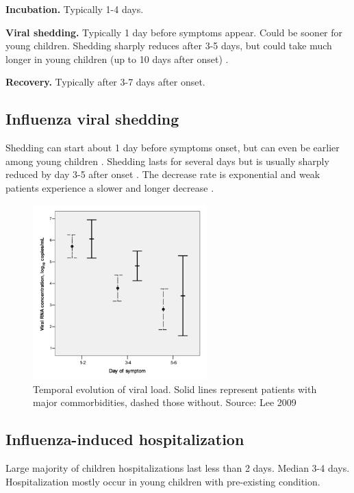 \documentclass[11pt, onecolumn]{article}
\begin{document}
\textbf{Incubation.} Typically 1-4 days.

\textbf{Viral shedding.} Typically 1 day before symptoms appear. Could be sooner for young children. Shedding sharply reduces after 3-5 days, but could take much longer in young children (up to 10 days after onset) \cite{Carrat:2008bk}. 

\textbf{Recovery.} Typically after 3-7 days after onset.


\subsection{Influenza viral shedding}

Shedding can start about 1 day before symptoms onset, but can even be earlier among young children \cite{CDC:2011wq}. Shedding lasts for several days but is usually sharply reduced by day 3-5 after onset \cite{CDC:2011wq}. The decrease rate is exponential and weak patients experience a slower and longer decrease \cite{Lee:2009dc}.

\begin{figure}[!ht]
\centering
    \includegraphics[angle=0,width=0.6\textwidth]{figures/VL_Lee.png}
\caption{Temporal evolution of viral load. Solid lines represent patients with major commorbidities, dashed those without. Source: Lee 2009 \cite{Lee:2009dc}}
\label{fig:VL_Lee}
\end{figure}


\subsection{Influenza-induced hospitalization}

Large majority of children hospitalizations last less than 2 days. Median 3-4 days. Hospitalization mostly occur in young children with pre-existing condition.
\end{document}
